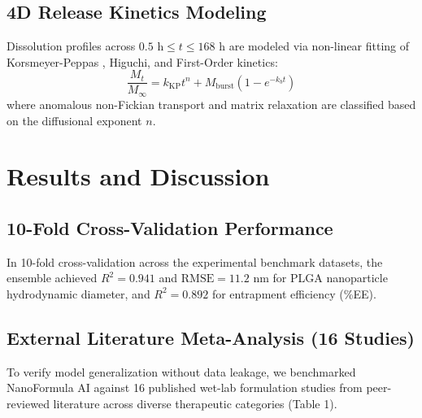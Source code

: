 \documentclass[twocolumn,10pt,3p]{elsarticle}
\begin{document}
\subsection{4D Release Kinetics Modeling}
Dissolution profiles across $0.5\text{ h} \le t \le 168\text{ h}$ are modeled via non-linear fitting of Korsmeyer-Peppas \cite{korsmeyer1983mechanisms}, Higuchi, and First-Order kinetics:
\begin{equation}
\frac{M_t}{M_\infty} = k_{\text{KP}} t^n + M_{\text{burst}} (1 - e^{-k_b t})
\end{equation}
where anomalous non-Fickian transport and matrix relaxation are classified based on the diffusional exponent $n$.

\section{Results and Discussion}

\subsection{10-Fold Cross-Validation Performance}
In 10-fold cross-validation across the experimental benchmark datasets, the ensemble achieved $R^2 = 0.941$ and $\text{RMSE} = 11.2\text{ nm}$ for PLGA nanoparticle hydrodynamic diameter, and $R^2 = 0.892$ for entrapment efficiency (\%EE).

\subsection{External Literature Meta-Analysis (16 Studies)}
To verify model generalization without data leakage, we benchmarked NanoFormula AI against 16 published wet-lab formulation studies from peer-reviewed literature across diverse therapeutic categories (Table 1).
\end{document}

